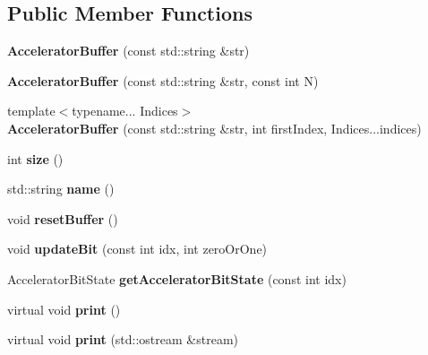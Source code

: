 \subsection*{Public Member Functions}
\begin{DoxyCompactItemize}
\item 
{\bfseries Accelerator\+Buffer} (const std\+::string \&str)\hypertarget{a00013_a5115079c3f3f8d32e713f78a91c93a7a}{}\label{a00013_a5115079c3f3f8d32e713f78a91c93a7a}

\item 
{\bfseries Accelerator\+Buffer} (const std\+::string \&str, const int N)\hypertarget{a00013_a6947082735241791c5170d677042da4a}{}\label{a00013_a6947082735241791c5170d677042da4a}

\item 
{\footnotesize template$<$typename... Indices$>$ }\\{\bfseries Accelerator\+Buffer} (const std\+::string \&str, int first\+Index, Indices...\+indices)\hypertarget{a00013_afe8b2a7e0b7b7992f45fe7021d106b66}{}\label{a00013_afe8b2a7e0b7b7992f45fe7021d106b66}

\item 
int {\bfseries size} ()\hypertarget{a00013_a249eae9f3b83072e5b101ba23f900e81}{}\label{a00013_a249eae9f3b83072e5b101ba23f900e81}

\item 
std\+::string {\bfseries name} ()\hypertarget{a00013_a3373218e4d430d061ba75135bf14ede3}{}\label{a00013_a3373218e4d430d061ba75135bf14ede3}

\item 
void {\bfseries reset\+Buffer} ()\hypertarget{a00013_aa5080c9a975871858b39d3394e867e77}{}\label{a00013_aa5080c9a975871858b39d3394e867e77}

\item 
void {\bfseries update\+Bit} (const int idx, int zero\+Or\+One)\hypertarget{a00013_a689855524e630049db6120a1493a3c45}{}\label{a00013_a689855524e630049db6120a1493a3c45}

\item 
Accelerator\+Bit\+State {\bfseries get\+Accelerator\+Bit\+State} (const int idx)\hypertarget{a00013_a29ece4f7b671308b89c06f3ac8e74b9e}{}\label{a00013_a29ece4f7b671308b89c06f3ac8e74b9e}

\item 
virtual void {\bfseries print} ()\hypertarget{a00013_a3776733a3196bca276988d4cc50a135a}{}\label{a00013_a3776733a3196bca276988d4cc50a135a}

\item 
virtual void {\bfseries print} (std\+::ostream \&stream)\hypertarget{a00013_a6f2cf905960a528fc829904a3c176c6e}{}\label{a00013_a6f2cf905960a528fc829904a3c176c6e}

\end{DoxyCompactItemize}
